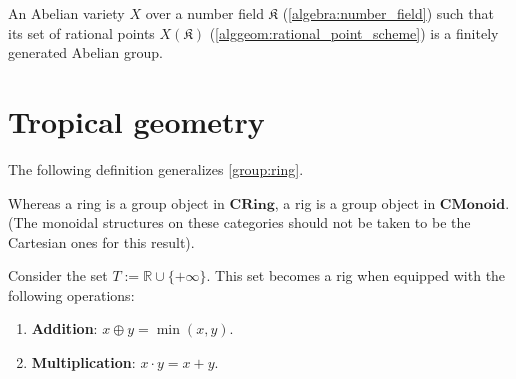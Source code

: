    \begin{theorem}
        An Abelian variety $X$ over a number field $\mathfrak{K}$ (\cref{algebra:number_field}) such that its set of rational points $X(\mathfrak{K})$ (\cref{alggeom:rational_point_scheme}) is a finitely generated Abelian group.
    \end{theorem}


\section{Tropical geometry}

    The following definition generalizes \cref{group:ring}.
    \begin{remark}
        Whereas a ring is a group object in $\mathbf{CRing}$, a rig is a group object in $\mathbf{CMonoid}$. (The monoidal structures on these categories should not be taken to be the Cartesian ones for this result).
    \end{remark}

    \begin{example}
        Consider the set $T:=\mathbb{R}\cup\{+\infty\}$. This set becomes a rig when equipped with the following operations:
        \begin{enumerate}
            \item\textbf{Addition}: $x\oplus y=\min(x,y)$.
            \item\textbf{Multiplication}: $x\cdot y=x+y$.
        \end{enumerate}
    \end{example}

